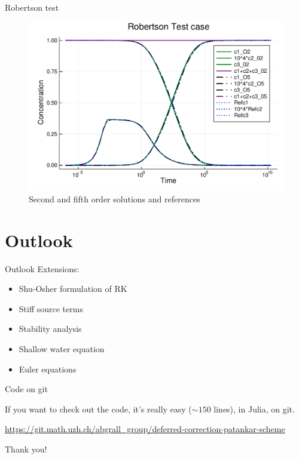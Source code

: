 \documentclass[aspectratio=169]{beamer}
\newcommand{\1}{\begin{pmatrix}
                 1\\
                 1
                \end{pmatrix}}
\begin{document}
\begin{frame}{Robertson test}
\begin{figure}[!htp]
\center
    \includegraphics[height=0.7\textheight]{images/RobertsonOrder25.pdf}
  \caption{ Second and fifth order solutions and references 
 }
  \label{fig:Robertson}
\end{figure}

\end{frame}

\section{Outlook}
\begin{frame}{Outlook }
Extensions:
\begin{itemize}
  \item Shu-Osher formulation of RK 
  \item Stiff source terms 
  \item Stability analysis
  \item Shallow water equation
  \item Euler equations 
\end{itemize}



\end{frame}

\begin{frame}{Code on git}

If you want to check out the code, it's really easy ($\sim 150$ lines), in Julia, on git.

\url{https://git.math.uzh.ch/abgrall_group/deferred-correction-patankar-scheme}

\vspace{1.5cm}
\centering \Huge Thank you!
\end{frame}
\end{document}
